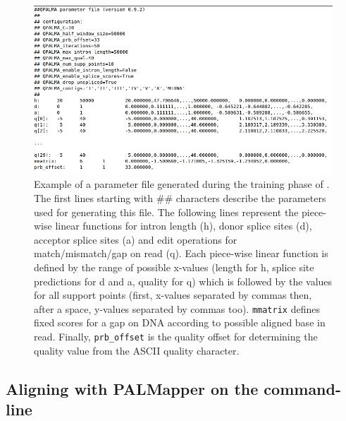 \documentclass{article}
\begin{document}
\begin{figure}[h!]
\begin{center}
\includegraphics[width=\textwidth]{QPALMAFile.jpg}
\end{center}
\caption{Example of a \QP{} parameter file generated during the training
  phase of \QP{}. The first lines starting with $\#\#$ characters
  describe the parameters used for generating this file. The following
  lines represent the piece-wise linear functions for intron length (h),
  donor splice sites (d), acceptor splice sites (a) and edit operations
  for match/mismatch/gap on read (q). Each piece-wise linear function is
  defined by the range of possible x-values (length for h, splice site
  predictions for d and a, quality for q) which is followed by the
  values for all support points (first, x-values separated by commas
  then, after a space, y-values separated by commas
  too). \texttt{mmatrix} defines fixed scores for a gap on DNA according
  to possible aligned base in read. Finally, \texttt{prb\_offset} is the
  quality offset for determining the quality value from the ASCII
  quality character.}
\label{fig:qp_parameter_file}
\end{figure}

\subsection{Aligning with PALMapper on the command-line}
\label{sec:aligningcl}
\end{document}

